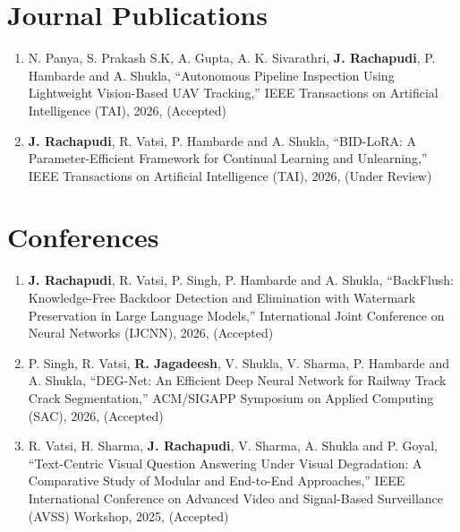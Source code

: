 \begin{Publications}

\pubpagenum

\section*{Journal Publications}
\begin{enumerate}

\item N. Panya, S. Prakash S.K, A. Gupta, A. K. Sivarathri, \textbf{J. Rachapudi}, P. Hambarde and A. Shukla, ``Autonomous Pipeline Inspection Using Lightweight Vision-Based UAV Tracking,'' IEEE Transactions on Artificial Intelligence (TAI), 2026, (Accepted)

\item \textbf{J. Rachapudi}, R. Vatsi, P. Hambarde and A. Shukla, ``BID-LoRA: A Parameter-Efficient Framework for Continual Learning and Unlearning,'' IEEE Transactions on Artificial Intelligence (TAI), 2026, (Under Review)

\end{enumerate}

\section*{Conferences}
\begin{enumerate}

\item \textbf{J. Rachapudi}, R. Vatsi, P. Singh, P. Hambarde and A. Shukla, ``BackFlush: Knowledge-Free Backdoor Detection and Elimination with Watermark Preservation in Large Language Models,'' International Joint Conference on Neural Networks (IJCNN), 2026, (Accepted)

\item P. Singh, R. Vatsi, \textbf{R. Jagadeesh}, V. Shukla, V. Sharma, P. Hambarde and A. Shukla, ``DEG-Net: An Efficient Deep Neural Network for Railway Track Crack Segmentation,'' ACM/SIGAPP Symposium on Applied Computing (SAC), 2026, (Accepted)

\item R. Vatsi, H. Sharma, \textbf{J. Rachapudi}, V. Sharma, A. Shukla and P. Goyal, ``Text-Centric Visual Question Answering Under Visual Degradation: A Comparative Study of Modular and End-to-End Approaches,'' IEEE International Conference on Advanced Video and Signal-Based Surveillance (AVSS) Workshop, 2025, (Accepted)


\end{enumerate}
\end{Publications}
